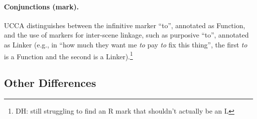 \documentclass[11pt,a4paper]{article}
\newcommand{\daniel}[1]{\footnote{\color{blue}DH: #1}}
\begin{document}
\paragraph{Conjunctions  (mark).}
      UCCA distinguishes between the infinitive marker ``to'', annotated as Function,
      and the use of markers for inter-scene linkage, such as purposive ``to'',
      annotated as Linker
      (e.g., in ``how much they want me \textit{to} pay \textit{to} fix this thing'',
      the first \textit{to} is a Function and the second is a Linker).\daniel{still
      struggling to find an R mark that shouldn't actually be an L}
    

\subsection{Other Differences}\label{sec:misc}
\end{document}
